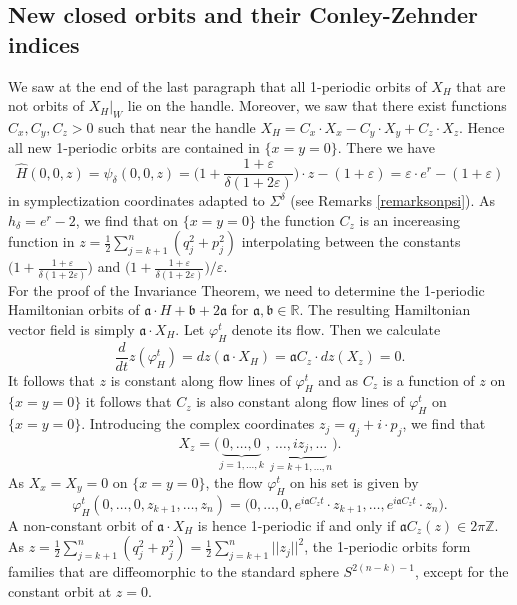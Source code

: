 \documentclass[a4paper,12pt,bibliography=totocnumbered,titlepage=false,abstracton,bookmarksnumbered=true]{scrartcl}
\newcommand{\veps}{\varepsilon}
\theoremstyle{definition}
\begin{document}
\subsection{New closed orbits and their Conley-Zehnder indices}\label{sec5.4}
We saw at the end of the last paragraph that all 1-periodic orbits of $X_H$ that are not orbits of $X_H|_W$ lie on the handle. Moreover, we saw that there exist functions $C_x, C_y, C_z>0$ such that near the handle $X_H=C_x{\cdot} X_x-C_y{\cdot} X_y+C_z{\cdot} X_z$. Hence all new 1-periodic orbits are contained in $\{x{=}y{=}0\}$. There we have
\[\widehat{H}(0,0,z)=\psi_\delta(0,0,z)=\Big(1+\frac{1+\veps}{\delta(1{+}2\veps)}\Big)\cdot z-(1{+}\veps)=\veps{\cdot} e^r-(1{+}\veps)\]
in symplectization coordinates adapted to $\Sigma^\delta$ (see Remarks \ref{remarksonpsi}). As $h_\delta=e^r{-}2$, we find that on $\{x{=}y{=}0\}$ the function $C_z$ is an incereasing function in $z=\frac{1}{2}\sum_{j=k+1}^n (q_j^2+p_j^2)$ interpolating between the constants $\big(1+\frac{1+\veps}{\delta(1+2\veps)}\big)$ and $\big(1+\frac{1+\veps}{\delta(1+2\veps)}\big)\big/\veps$.\\
For the proof of the Invariance Theorem, we need to determine the 1-periodic Hamiltonian orbits of $\mathfrak{a}{\cdot} H +\mathfrak{b}+2\mathfrak{a}$ for $\mathfrak{a},\mathfrak{b}\in\mathbb{R}$. The resulting Hamiltonian vector field is simply $\mathfrak{a}{\cdot} X_H$. Let $\varphi_H^t$ denote its flow. Then we calculate
\[\frac{d}{dt}z(\varphi^t_H)= dz(\mathfrak{a}{\cdot} X_H)=\mathfrak{a} C_z\cdot dz(X_z)=0.\]
It follows that $z$ is constant along flow lines of $\varphi_H^t$ and as $C_z$ is a function of $z$ on $\{x{=}y{=}0\}$ it follows that $C_z$ is also constant along flow lines of $\varphi_H^t$ on $\{x{=}y{=}0\}$. Introducing the complex coordinates $z_j=q_j+i\cdot p_j$, we find that 
\[ X_z=\Big(\underbrace{0,\dots,0}_{j=1,...,k}\, \textbf{,}\underbrace{\dots,iz_j,\dots}_{j=k+1,...,n}\Big).\]
As $X_x=X_y=0$ on $\{x{=}y{=}0\}$, the flow $\varphi^t_H$ on his set is given by
\begin{equation}\label{eqA}
  \varphi^t_H(0,\dots,0,z_{k+1},\dots,z_n)=\Big(0,\dots,0,e^{i\mathfrak{a} C_z t}\cdot z_{k+1},\dots, e^{i\mathfrak{a} C_z t}\cdot z_n\Big).
 \end{equation}
A non-constant orbit of $\mathfrak{a}{\cdot} X_H$ is hence 1-periodic if and only if $\mathfrak{a} C_z(z)\in 2\pi\mathbb{Z}$. As $z=\frac{1}{2}\sum_{j=k+1}^n(q_j^2{+}p_j^2)=\frac{1}{2}\sum_{j=k+1}^n ||z_j||^2$, the 1-periodic orbits form families that are diffeomorphic to the standard sphere $S^{2(n-k)-1}$, except for the constant orbit at $z=0$.\bigskip\\
\end{document}
